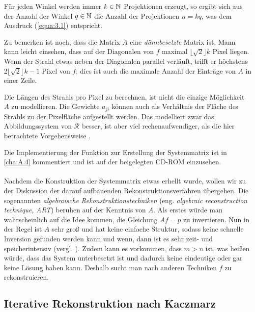 Für jeden Winkel werden immer $k \in \mathbb{N}$ Projektionen erzeugt, so ergibt sich aus der Anzahl der Winkel $q \in \mathbb{N}$ die Anzahl der Projektionen $n = kq$, was dem Ausdruck (\ref{equa:3.1}) entspricht.   

Zu bemerken ist noch, dass die Matrix $A$ eine \textit{dünnbesetzte} Matrix ist. Mann kann leicht einsehen, dass auf der Diagonalen von $f$ maximal $\lfloor\sqrt{2}\rfloor k$ Pixel liegen. Wenn der Strahl etwas neben der Diagonalen parallel verläuft, trifft er höchstens $2\lfloor\sqrt{2}\rfloor k - 1$ Pixel von $f$; dies ist auch die maximale Anzahl der Einträge von $A$ in einer Zeile.

\begin{Bemerkung}
	Die Längen des Strahls pro Pixel zu berechnen, ist nicht die einzige Möglichkeit $A$ zu modellieren. Die Gewichte $a_{ji}$ können auch als Verhältnis der Fläche des Strahls zu der Pixelfläche aufgestellt werden. Das modelliert zwar das Abbildungssystem von $\mathcal{R}$ besser, ist aber viel rechenaufwendiger, als die hier betrachtete Vorgehensweise \cite[S. 141]{Zeng09}.
\end{Bemerkung}
Die Implementierung der Funktion zur Erstellung der Systemmatrix ist in \ref{cha:A.4} kommentiert und ist auf der beigelegten CD-ROM einzusehen.\\\\

Nachdem die Konstruktion der Systemmatrix etwas erhellt wurde, wollen wir zu der Diskussion der darauf aufbauenden Rekonstruktionsverfahren übergehen. Die sogenannten \textit{algebraische Rekonstruktionstechniken} (eng. \textit{algebraic reconstruction technique, ART}) beruhen auf der Kenntnis von $A$. Als erstes würde man wahrscheinlich auf die Idee kommen, die Gleichung $Af = p$ zu invertieren. Nun in der Regel ist $A$ sehr groß und hat keine einfache Struktur, sodass keine schnelle Inversion gefunden werden kann und wenn, dann ist es sehr zeit- und speicherintensiv (vergl. \cite[S. 157]{Burg91}). Zudem kann es vorkommen, dass $m > n$ ist, was heißen würde, dass das System unterbesetzt ist und dadurch keine eindeutige oder gar keine Lösung haben kann. Deshalb sucht man nach anderen Techniken $f$ zu rekonstruieren.

\subsection*{Iterative Rekonstruktion nach Kaczmarz}
\label{cha:3.2.1}

